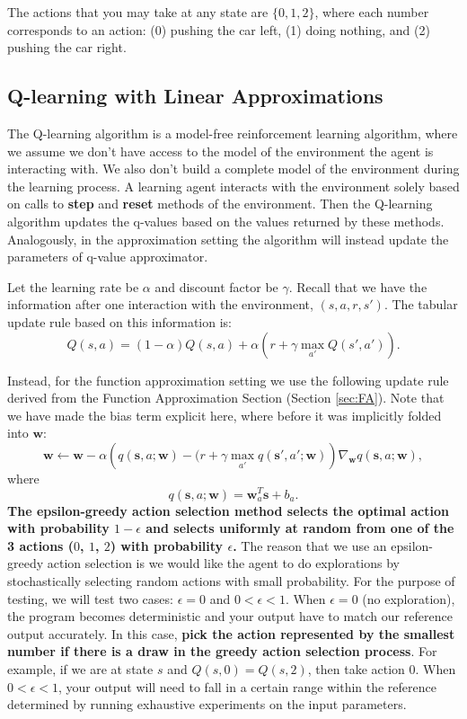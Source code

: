 \documentclass[11pt,addpoints,answers]{exam}
\newcommand{\sv}{\mathbf{s}}
\newcommand{\wv}{\mathbf{w}}
\begin{document}
The actions that you may take at any state are $\{0, 1, 2\}$, where each number corresponds to an action: (0) pushing the car left, (1) doing nothing, and (2) pushing the car right.

\subsection{Q-learning with Linear Approximations}\label{subsec:q_learning}
The Q-learning algorithm is a model-free reinforcement learning algorithm, where we assume we don't have access to the model of the environment the agent is interacting with. We also don't build a complete model of the environment during the learning process. A learning agent interacts with the environment solely based on calls to \textbf{step} and \textbf{reset} methods of the environment. Then the Q-learning algorithm updates the q-values based on the values returned by these methods. Analogously, in the approximation setting the algorithm will instead update the parameters of q-value approximator.


Let the learning rate be $\alpha$ and discount factor be $\gamma$. Recall that we have the information after one interaction with the environment, $(s, a, r, s')$. The tabular update rule based on this information is: 
\[
    Q(s,a) = (1 - \alpha) Q(s, a) + \alpha \left(r + \gamma \max_{a'} Q(s', a')\right).
\]

Instead, for the function approximation setting we use the following update rule derived from the Function Approximation Section (Section \ref{sec:FA}). Note that we have made the bias term explicit here, where before it was implicitly folded into $\wv$:
\[
\wv \leftarrow \wv - \alpha \left(q(\sv, a; \wv) - (r + \gamma \max_{a'} q(\sv', a'; \wv)\right) \nabla_\wv q(\sv, a; \wv),
\]
where
\[
q(\sv,a;\wv) = \wv_a^T \sv + b_a.
\]
\textbf{The epsilon-greedy action selection method selects the optimal action with probability $1 - \epsilon$ and selects uniformly at random from one of the 3 actions ($0$, $1$, $2$) with probability $\epsilon$.} The reason that we use an epsilon-greedy action selection is we would like the agent to do explorations by stochastically selecting random actions with small probability. For the purpose of testing, we will test two cases: $\epsilon = 0$ and $0 < \epsilon < 1$. When $\epsilon = 0$ (no exploration), the program becomes deterministic and your output have to match our reference output accurately. In this case, \textbf{pick the action represented by the smallest number if there is a draw in the greedy action selection process}. For example, if we are at state $s$ and $Q(s, 0) = Q(s, 2)$, then take action $0$. When $0 < \epsilon < 1$, your output will need to fall in a certain range within the reference determined by running exhaustive experiments on the input parameters.
\end{document}
